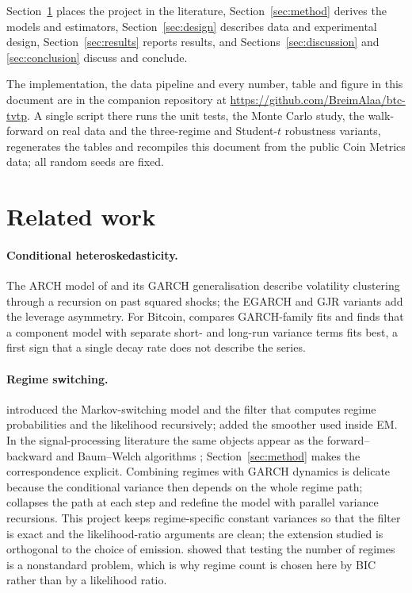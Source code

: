 \documentclass[11pt,a4paper]{article}
\begin{document}
Section~\ref{sec:related} places the project in the literature, Section~\ref{sec:method} derives the models and estimators, Section~\ref{sec:design} describes data and experimental design, Section~\ref{sec:results} reports results, and Sections~\ref{sec:discussion} and \ref{sec:conclusion} discuss and conclude.

The implementation, the data pipeline and every number, table and figure in this document are in the companion repository at \url{https://github.com/BreimAlaa/btc-tvtp}. A single script there runs the unit tests, the Monte Carlo study, the walk-forward on real data and the three-regime and Student-$t$ robustness variants, regenerates the tables and recompiles this document from the public Coin Metrics data; all random seeds are fixed.

\section{Related work}\label{sec:related}
\paragraph{Conditional heteroskedasticity.} The ARCH model of \citet{engle1982} and its GARCH generalisation \citep{bollerslev1986} describe volatility clustering through a recursion on past squared shocks; the EGARCH \citep{nelson1991} and GJR \citep{gjr1993} variants add the leverage asymmetry. For Bitcoin, \citet{katsiampa2017} compares GARCH-family fits and finds that a component model with separate short- and long-run variance terms fits best, a first sign that a single decay rate does not describe the series.

\paragraph{Regime switching.} \citet{hamilton1989} introduced the Markov-switching model and the filter that computes regime probabilities and the likelihood recursively; \citet{kim1994} added the smoother used inside EM. In the signal-processing literature the same objects appear as the forward--backward and Baum--Welch algorithms \citep{baum1970,rabiner1989,viterbi1967}; Section~\ref{sec:method} makes the correspondence explicit. Combining regimes with GARCH dynamics is delicate because the conditional variance then depends on the whole regime path; \citet{gray1996} collapses the path at each step and \citet{haas2004} redefine the model with parallel variance recursions. This project keeps regime-specific constant variances so that the filter is exact and the likelihood-ratio arguments are clean; the extension studied is orthogonal to the choice of emission. \citet{hansen1992} showed that testing the number of regimes is a nonstandard problem, which is why regime count is chosen here by BIC \citep{schwarz1978} rather than by a likelihood ratio.
\end{document}

